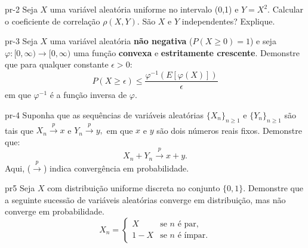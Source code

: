 \begin{problema}{}{pr-2}
Seja $X$ uma variável aleatória uniforme no intervalo (0,1) e $Y=X^2.$ Calcular o coeficiente de correlação $\rho(X, Y).$ São $X$ e $Y$ independentes? Explique.
\end{problema}


\begin{problema}{}{pr-3}
Seja $X$ uma variável aleatória \textbf{não negativa} ($P(X \ge 0)=1$) e seja $\varphi : [0, \infty) \to [0, \infty)$ uma função \textbf{convexa} e \textbf{estritamente crescente}. Demonstre que para qualquer constante $\epsilon > 0$:
\[
P(X \ge \epsilon) \le \frac{\varphi^{-1}(E[\varphi(X)])}{\epsilon}
\] em que $\varphi^{-1}$ é a função inversa de $\varphi$.
\end{problema}


\begin{problema}{}{pr-4}
Suponha que as sequências de variáveis aleatórias $\{X_n\}_{n\geq 1}$ e $\{Y_n\}_{n\geq 1}$ são tais que $X_n \xrightarrow{p} x$ e $Y_n \xrightarrow{p} y,$  em que $x$ e $y$ são dois números reais fixos. Demonstre que:
\[ X_n + Y_n \xrightarrow{p} x + y. \] Aqui, ($ \xrightarrow{p}$) indica convergência em probabilidade.
\end{problema}




\begin{problema}{}{pr5}
Seja $X$ com distribuição uniforme discreta no conjunto $\{0, 1\}$. Demonstre que a seguinte sucessão de variáveis aleatórias converge em distribuição, mas não converge em probabilidade.
\[
X_n = \begin{cases} 
	X & \text{se } n \text{ é par,} \\
	1-X & \text{se } n \text{ é ímpar.}
\end{cases}
\]
\end{problema}


\centering {\scshape\bf\textcolor{darkred}{BOA PROVA}}

%




